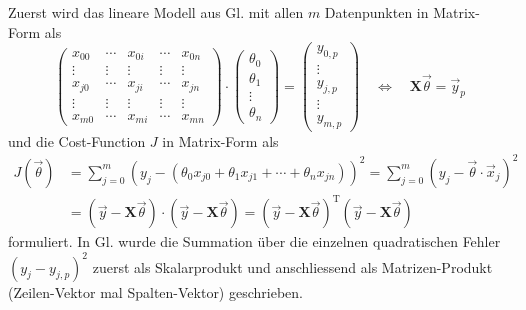 Zuerst wird das lineare Modell aus Gl.  mit allen
$m$ Datenpunkten in Matrix-Form als
\begin{equation}
    \begin{pmatrix}
        x_{00}& \cdots& x_{0i}& \cdots& x_{0n}\\
        \vdots& \vdots& \vdots& \vdots& \vdots\\
        x_{j0}& \cdots& x_{ji}& \cdots& x_{jn}\\
        \vdots& \vdots& \vdots& \vdots& \vdots\\
        x_{m0}& \cdots& x_{mi}& \cdots& x_{mn}
    \end{pmatrix}
    \cdot
    \begin{pmatrix}
        \theta_0\\ \theta_1 \\ \vdots\\ \theta_n
    \end{pmatrix}
    = \begin{pmatrix}
        y_{0,p}\\ \vdots \\ y_{j,p} \\ \vdots \\ y_{m,p}
    \end{pmatrix}
    \quad \iff \quad
    \mathbf{X} \vec \theta = \vec y_p
    \label{ml:regression:lstsq:modell}
\end{equation}
und die Cost-Function $J$ in Matrix-Form als
\begin{align}
    J(\vec \theta) &= \sum_{j=0}^m \left(y_j - (\theta_0 x_{j0} + \theta_1 x_{j1} + \cdots + \theta_n x_{jn}) \right)^2
    = \sum_{j=0}^{m} \left( y_j - \vec \theta \cdot \vec x_j \right)^2 \nonumber\\
    &= \left(\vec y - \mathbf{X} \vec \theta\right) \cdot \left(\vec y - \mathbf{X} \vec \theta\right)
    = \left(\vec y - \mathbf{X} \vec \theta\right)^\mathrm{T} \left(\vec y - \mathbf{X} \vec \theta\right)
    \label{ml:regression:lstsq:cost}
\end{align}
formuliert. In Gl.  wurde die Summation über die
einzelnen quadratischen Fehler $(y_j - y_{j,p})^2$ zuerst als Skalarprodukt und
anschliessend als Matrizen-Produkt (Zeilen-Vektor mal Spalten-Vektor) geschrieben.


